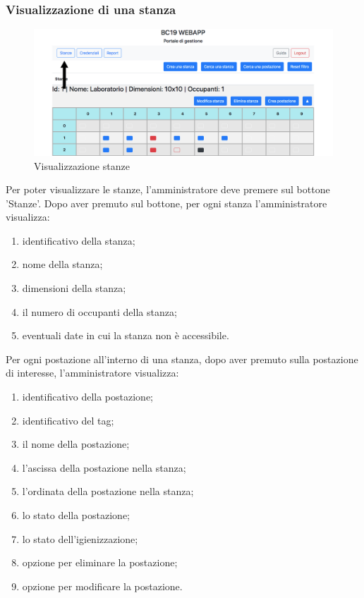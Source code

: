 \subsubsection{Visualizzazione di una stanza}
\begin{figure}[H]
	\centering
	\includegraphics[width=15cm]{res/images/visStanza.png}
	\caption{Visualizzazione stanze}
\end{figure}
Per poter visualizzare le stanze, l'amministratore deve premere sul bottone 'Stanze'.
Dopo aver premuto sul bottone, per ogni stanza l'amministratore visualizza:
\begin{enumerate}
	\item identificativo della stanza;
	\item nome della stanza;
	\item dimensioni della stanza;
	\item il numero di occupanti della stanza;
	\item eventuali date in cui la stanza non è accessibile.
\end{enumerate}
Per ogni postazione all'interno di una stanza, dopo aver premuto sulla postazione di interesse, l'amministratore visualizza:
\begin{enumerate}
	\item identificativo della postazione;
	\item identificativo del tag;
	\item il nome della postazione;
	\item l'ascissa della postazione nella stanza;
	\item l'ordinata della postazione nella stanza;
	\item lo stato della postazione;
	\item lo stato dell'igienizzazione;
	\item opzione per eliminare la postazione;
	\item opzione per modificare la postazione.
	
\end{enumerate}

